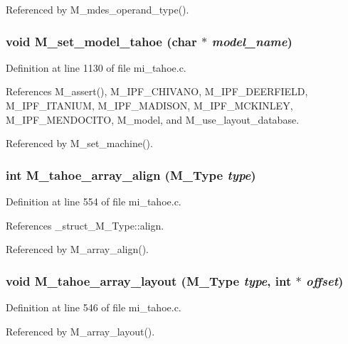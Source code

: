 Referenced by M\_\-mdes\_\-operand\_\-type().
\subsubsection{\setlength{\rightskip}{0pt plus 5cm}void M\_\-set\_\-model\_\-tahoe (char $\ast$ {\em model\_\-name})}\label{m__tahoe_8h_b89c7354a24ed1af09c5050eaa5faaf7}




Definition at line 1130 of file mi\_\-tahoe.c.

References M\_\-assert(), M\_\-IPF\_\-CHIVANO, M\_\-IPF\_\-DEERFIELD, M\_\-IPF\_\-ITANIUM, M\_\-IPF\_\-MADISON, M\_\-IPF\_\-MCKINLEY, M\_\-IPF\_\-MENDOCITO, M\_\-model, and M\_\-use\_\-layout\_\-database.

Referenced by M\_\-set\_\-machine().
\subsubsection{\setlength{\rightskip}{0pt plus 5cm}int M\_\-tahoe\_\-array\_\-align (\bf{M\_\-Type} {\em type})}\label{m__tahoe_8h_c90662ba62bbe78bb455d3bb4b08802e}




Definition at line 554 of file mi\_\-tahoe.c.

References \_\-struct\_\-M\_\-Type::align.

Referenced by M\_\-array\_\-align().
\subsubsection{\setlength{\rightskip}{0pt plus 5cm}void M\_\-tahoe\_\-array\_\-layout (\bf{M\_\-Type} {\em type}, int $\ast$ {\em offset})}\label{m__tahoe_8h_3d76a0fdf56be863526be8b3a8fe5967}




Definition at line 546 of file mi\_\-tahoe.c.

Referenced by M\_\-array\_\-layout().
